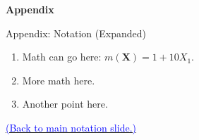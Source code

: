 \documentclass[9pt,aspectratio=169]{beamer}
\begin{document}
{
}

{
\begin{frame}
\vspace{1cm}
 \textbf{{\Huge Appendix}}
\end{frame}
}

\begin{frame}{\hypertarget{appendix:notation}{Appendix: Notation (Expanded)}}

\begin{enumerate}\itemsep4mm
    \item Math can go here: $m(\bm{X}) = 1 + 10X_1$.
    \item More math here.
    \item Another point here.
\end{enumerate}
\vspace{4mm}
\begin{center}
    \hyperlink{notation}{\textcolor{blue}{{\small (Back to main notation slide.)}}}
\end{center}
    
\end{frame}
\end{document}
